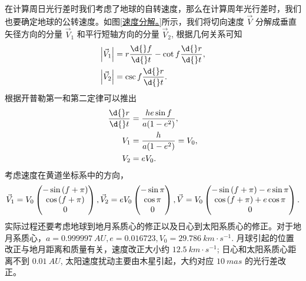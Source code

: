 \documentclass[UTF8, 12pt, a4paper, oneside, onecolumn, fontset=none]{ctexart}
\begin{document}
在计算周日光行差时我们考虑了地球的自转速度，那么在计算周年光行差时，我们也要确定地球的公转速度。如图\ref{速度分解。}所示，我们将切向速度 $\vec{V}$ 分解成垂直矢径方向的分量 $\vec{V}_{1}$ 和平行短轴方向的分量 $\vec{V}_{2}$, 根据几何关系可知
\begin{align}
\mleft\vert\vec{V}_{1}\mright\vert{}&=r\frac{\d{}f}{\d{}t}-\cot{f}\frac{\d{}r}{\d{}t},\\
\mleft\vert\vec{V}_{2}\mright\vert{}&=\csc{f}\frac{\d{}r}{\d{}t}.
\end{align}
根据开普勒第一和第二定律可以推出
\begin{align}
\frac{\d{}r}{\d{}t}&=\frac{he\sin{f}}{a\mleft(1-e^{2}\mright)},\\
V_{1}&=\frac{h}{a\mleft(1-e^{2}\mright)}=V_{0},\\
V_{2}&=eV_{0}.
\end{align}
考虑速度在黄道坐标系中的方向，
\begin{equation}
\vec{V}_{1}=V_{0}\begin{pmatrix}
-\sin{\mleft(f+\pi\mright)}\\
\cos{\mleft(f+\pi\mright)}\\
0
\end{pmatrix},
\vec{V}_{2}=eV_{0}\begin{pmatrix}
-\sin{\pi}\\
\cos{\pi}\\
0
\end{pmatrix},
\vec{V}=V_{0}\begin{pmatrix}
-\sin{\mleft(f+\pi\mright)}-e\sin{\pi}\\
\cos{\mleft(f+\pi\mright)}+e\cos{\pi}\\
0
\end{pmatrix}.
\end{equation}
实际过程还要考虑地球到地月系质心的修正以及日心到太阳系质心的修正。对于地月系质心，$a=\qty{0.999997}{AU}, e=0.016723, V_{0}=\qty{29.786}{km\cdot{}s^{-1}}$. 月球引起的位置改正与地月距离和质量有关，速度改正大小约 $\qty{12.5}{km\cdot{}s^{-1}}$; 日心和太阳系质心距离不到 $\qty{0.01}{AU}$, 太阳速度扰动主要由木星引起，大约对应 $\qty{10}{mas}$ 的光行差改正。
\end{document}
